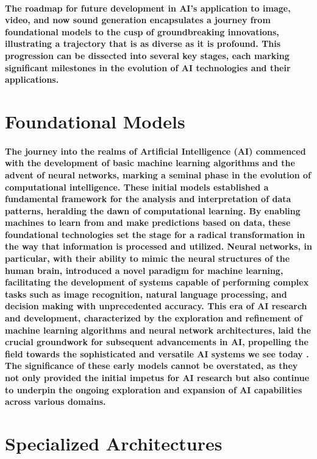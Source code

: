 \documentclass[11pt,a4paper,oneside]{report}
\begin{document}
\paragraph{The roadmap for future development in AI's application to image, video, and now sound generation encapsulates a journey from foundational models to the cusp of groundbreaking innovations, illustrating a trajectory that is as diverse as it is profound. This progression can be dissected into several key stages, each marking significant milestones in the evolution of AI technologies and their applications.}

\section{Foundational Models}
\paragraph{The journey into the realms of Artificial Intelligence (AI) commenced with the development of basic machine learning algorithms and the advent of neural networks, marking a seminal phase in the evolution of computational intelligence. These initial models established a fundamental framework for the analysis and interpretation of data patterns, heralding the dawn of computational learning. By enabling machines to learn from and make predictions based on data, these foundational technologies set the stage for a radical transformation in the way that information is processed and utilized. Neural networks, in particular, with their ability to mimic the neural structures of the human brain, introduced a novel paradigm for machine learning, facilitating the development of systems capable of performing complex tasks such as image recognition, natural language processing, and decision making with unprecedented accuracy. This era of AI research and development, characterized by the exploration and refinement of machine learning algorithms and neural network architectures, laid the crucial groundwork for subsequent advancements in AI, propelling the field towards the sophisticated and versatile AI systems we see today \cite{huang2022large}. The significance of these early models cannot be overstated, as they not only provided the initial impetus for AI research but also continue to underpin the ongoing exploration and expansion of AI capabilities across various domains.}

\section{Specialized Architectures}
\end{document}
